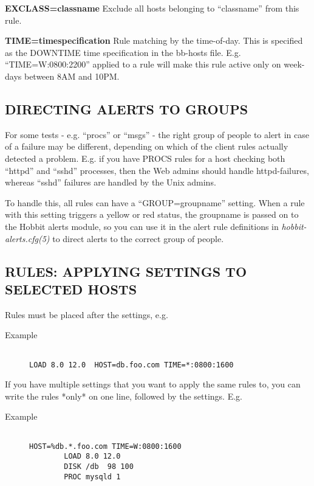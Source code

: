  \textbf{EXCLASS=classname}
 Exclude all hosts belonging to ``classname'' from this rule. 


 \textbf{TIME=timespecification}
 Rule matching by the time-of-day. This is specified as the DOWNTIME time specification in the bb-hosts file. E.g. ``TIME=W:0800:2200'' applied to a rule will make this rule active only on week-days between 8AM and 10PM. 


 
\subsection{DIRECTING ALERTS TO GROUPS}
 For some tests - e.g. ``procs'' or ``msgs'' - the right group of
 people to alert in case of a failure may be different, depending on
 which of the client rules actually detected a problem. E.g. if you
 have PROCS rules for a host checking both ``httpd'' and ``sshd''
 processes, then the Web admins should handle httpd-failures, whereas
 ``sshd'' failures are handled by the Unix admins. 


  To handle this, all rules can have a ``GROUP=groupname'' setting. When a rule with this setting triggers a yellow or red status, the groupname is passed on to the Hobbit alerts module, so you can use it in the alert rule definitions in \emph{hobbit-alerts.cfg(5)}
 to direct alerts to the correct group of people. 



 
\subsection{RULES: APPLYING SETTINGS TO SELECTED HOSTS}
 Rules must be placed after the settings, e.g. \begin{description}
\item[Example]\begin{verbatim}

LOAD 8.0 12.0  HOST=db.foo.com TIME=*:0800:1600

\end{verbatim}


\end{description}



  If you have multiple settings that you want to apply the same rules
  to, you can write the rules *only* on one line, followed by the
  settings. E.g. 

\begin{description}
\item[Example]\begin{verbatim}

HOST=%db.*.foo.com TIME=W:0800:1600
        LOAD 8.0 12.0
        DISK /db  98 100
        PROC mysqld 1

\end{verbatim}


\end{description}



